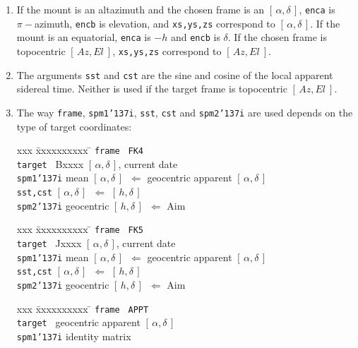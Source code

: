 \documentclass[12pt,fleqn,twoside]{article}
\renewcommand{\_}{{\tt\char'137}}     %
\newcommand{\radec}     {$[\,\alpha,\delta\,]$}
\newcommand{\hadec}     {$[\,h,\delta\,]$}
\newcommand{\azel}      {$[\,Az,El~]$}
\newcommand{\xy}        {$[\,x,y\,]$}
\begin{document}
{\begin{enumerate}
      In the present case, the encoder values and the pointing-origin \xy\
      coordinates are known, and the target position is to be
      determined.  The result is in Cartesian coordinates.
\item If the mount is an altazimuth and the chosen frame is an
      \radec, {\tt enca} is $\pi-$azimuth, {\tt encb}
      is elevation, and {\tt xs,ys,zs}
      correspond to \radec.  If the mount is an equatorial, {\tt enca}
      is $-h$ and {\tt encb} is $\delta$.  If the chosen frame is
      topocentric \azel, {\tt xs,ys,zs} correspond to \azel.
\item The arguments {\tt sst} and {\tt cst} are the
      sine and cosine of the local
      apparent sidereal time.  Neither is used if the target frame is
      topocentric \azel.
\item The way {\tt frame}, {\tt spm1\_i}, {\tt sst}, {\tt cst} and
      {\tt spm2\_i} are used depends on the type of target coordinates:
      \begin{tabbing}
         xxx \= xxxxxxxxxx \= \kill
         \> {\tt frame  } \> {\tt FK4} \\
         \> {\tt target } \> Bxxxx \radec, current date \\
         \> {\tt spm1\_i} \>
                 mean \radec\ $\Leftarrow$ geocentric apparent \radec \\
         \> {\tt sst,cst} \> \radec\ $\Leftarrow$ \hadec \\
         \> {\tt spm2\_i} \>  geocentric \hadec\ $\Leftarrow$ {\sc Aim}
      \end{tabbing}
      \begin{tabbing}
         xxx \= xxxxxxxxxx \= \kill
         \> {\tt frame  } \> {\tt FK5} \\
         \> {\tt target } \> Jxxxx \radec, current date \\
         \> {\tt spm1\_i} \>
                 mean \radec\ $\Leftarrow$ geocentric apparent \radec \\
         \> {\tt sst,cst} \> \radec\ $\Leftarrow$ \hadec \\
         \> {\tt spm2\_i} \> geocentric \hadec\ $\Leftarrow$ {\sc Aim}
      \end{tabbing}
      \begin{tabbing}
         xxx \= xxxxxxxxxx \= \kill
         \> {\tt frame  } \> {\tt APPT} \\
         \> {\tt target } \> geocentric apparent \radec \\
         \> {\tt spm1\_i} \> identity matrix \\

\end{tabbing}
\end{enumerate}}
\end{document}
